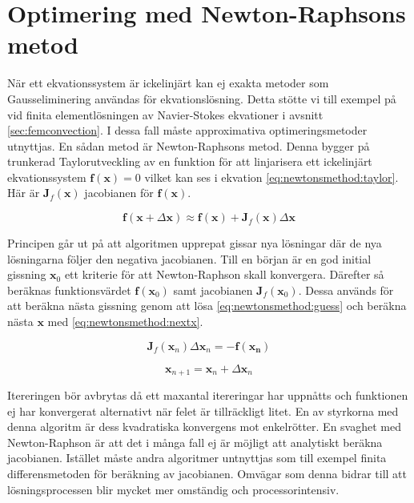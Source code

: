 \section{Optimering med Newton-Raphsons metod}

När ett ekvationssystem är ickelinjärt kan ej exakta metoder som Gausseliminering användas
för ekvationslösning. Detta stötte vi till exempel på vid finita elementlösningen
av Navier-Stokes ekvationer i avsnitt \ref{sec:femconvection}.
I dessa fall måste approximativa optimeringsmetoder utnyttjas. En sådan
metod är Newton-Raphsons metod. Denna bygger på trunkerad Taylorutveckling 
av en funktion för att linjarisera ett ickelinjärt ekvationssystem
$\mathbf{f}(\mathbf{x}) = 0$
vilket kan ses i ekvation \eqref{eq:newtonsmethod:taylor}. Här är
$\mathbf{J}_f(\mathbf{x})$ jacobianen för $\mathbf{f}(\mathbf{x})$. 

\begin{equation}
\label{eq:newtonsmethod:taylor}
\mathbf{f}(\mathbf{x} + \Delta\mathbf{x}) \approx \mathbf{f}(\mathbf{x}) +
\mathbf{J}_f(\mathbf{x})\Delta\mathbf{x}
\end{equation}

\noindent
Principen går ut på att algoritmen upprepat gissar nya lösningar där de
nya lösningarna följer den negativa jacobianen. Till en början är en god initial gissning
$\mathbf{x}_0$ ett kriterie för att Newton-Raphson skall konvergera. Därefter så beräknas
funktionsvärdet $\mathbf{f}(\mathbf{x}_0)$ samt jacobianen $\mathbf{J}_f(\mathbf{x}_0)$.
Dessa används för att beräkna nästa gissning genom att lösa
\eqref{eq:newtonsmethod:guess} och beräkna nästa $\mathbf{x}$ med
\eqref{eq:newtonsmethod:nextx}. \cite{heath2002}

\begin{equation}
\label{eq:newtonsmethod:guess}
\mathbf{J}_f(\mathbf{x}_n)\Delta\mathbf{x}_n = -\mathbf{f}(\mathbf{x_n})
\end{equation}

\begin{equation}
\label{eq:newtonsmethod:nextx}
\mathbf{x}_{n+1} = \mathbf{x}_n + \Delta\mathbf{x}_n
\end{equation}

\noindent
Itereringen bör avbrytas då ett maxantal itereringar har uppnåtts och funktionen
ej har konvergerat alternativt när felet är tillräckligt litet. En av styrkorna 
med denna algoritm är dess kvadratiska konvergens mot enkelrötter. \cite{ympa95}
En svaghet med Newton-Raphson är att det i många fall ej är möjligt att analytiskt beräkna
jacobianen. Istället måste andra algoritmer untnyttjas som till exempel finita differensmetoden
för beräkning av jacobianen. Omvägar som denna bidrar till att lösningsprocessen blir mycket
mer omständig och processorintensiv. 

